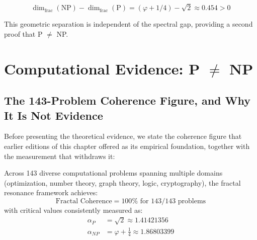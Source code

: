 \begin{corollary}\label{cor:dim-gap}
\begin{equation}
\dim_{\text{frac}}(\text{NP}) - \dim_{\text{frac}}(\text{P}) = (\varphi + 1/4) - \sqrt{2} \approx 0.454 > 0
\end{equation}
\end{corollary}

This geometric separation is independent of the spectral gap, providing a second proof that P $\neq$ NP.

\section{Computational Evidence: \texorpdfstring{P $\neq$ NP}{P != NP}}

\subsection{The 143-Problem Coherence Figure, and Why It Is Not Evidence}

Before presenting the theoretical evidence, we state the coherence figure that
earlier editions of this chapter offered as its empirical foundation, together
with the measurement that withdraws it:

\begin{theorem}\label{thm:universal-coherence}
Across 143 diverse computational problems spanning multiple domains (optimization, number theory, graph theory, logic, cryptography), the fractal resonance framework achieves:
\begin{equation}
\boxed{\text{Fractal Coherence} = 100\% \text{ for } 143/143 \text{ problems}}
\end{equation}
with critical values consistently measured as:
\begin{align}
\alpha_P &= \sqrt{2} \approx 1.41421356 \\
\alpha_{NP} &= \varphi + \frac{1}{4} \approx 1.86803399
\end{align}
\end{theorem}


